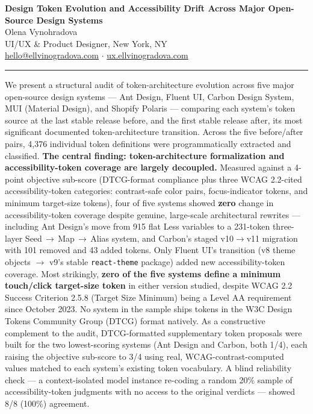 \documentclass[11pt]{article}
\newcommand{\paperauthor}{Olena Vynohradova}
\begin{document}
\begin{center}
{\LARGE\bfseries Design Token Evolution and Accessibility Drift Across Major Open-Source Design Systems}\\[1em]
{\large \paperauthor}\\[0.2em]
UI/UX \& Product Designer, New York, NY\\
\href{mailto:hello@ellvinogradova.com}{hello@ellvinogradova.com} \(\cdot\) \href{https://ux.ellvinogradova.com}{ux.ellvinogradova.com}
\end{center}

\vspace{1em}
\noindent\rule{\textwidth}{0.5pt}
\vspace{0.5em}

We present a structural audit of token-architecture evolution across five major open-source design systems --- Ant Design, Fluent UI, Carbon Design System, MUI (Material Design), and Shopify Polaris --- comparing each system's token source at the last stable release before, and the first stable release after, its most significant documented token-architecture transition. Across the five before/after pairs, 4{,}376 individual token definitions were programmatically extracted and classified. \textbf{The central finding: token-architecture formalization and accessibility-token coverage are largely decoupled.} Measured against a 4-point objective sub-score (DTCG-format compliance plus three WCAG 2.2-cited accessibility-token categories: contrast-safe color pairs, focus-indicator tokens, and minimum target-size tokens), four of five systems showed \textbf{zero} change in accessibility-token coverage despite genuine, large-scale architectural rewrites --- including Ant Design's move from 915 flat Less variables to a 231-token three-layer Seed\,\(\to\)\,Map\,\(\to\)\,Alias system, and Carbon's staged v10\(\to\)v11 migration with 101 removed and 43 added tokens. Only Fluent UI's transition (v8 theme objects \(\to\) v9's stable \texttt{react-theme} package) added new accessibility-token coverage. Most strikingly, \textbf{zero of the five systems define a minimum touch/click target-size token} in either version studied, despite WCAG 2.2 Success Criterion 2.5.8 (Target Size Minimum) being a Level AA requirement since October 2023. No system in the sample ships tokens in the W3C Design Tokens Community Group (DTCG) format natively. As a constructive complement to the audit, DTCG-formatted supplementary token proposals were built for the two lowest-scoring systems (Ant Design and Carbon, both 1/4), each raising the objective sub-score to 3/4 using real, WCAG-contrast-computed values matched to each system's existing token vocabulary. A blind reliability check --- a context-isolated model instance re-coding a random 20\% sample of accessibility-token judgments with no access to the original verdicts --- showed 8/8 (100\%) agreement.
\end{document}
